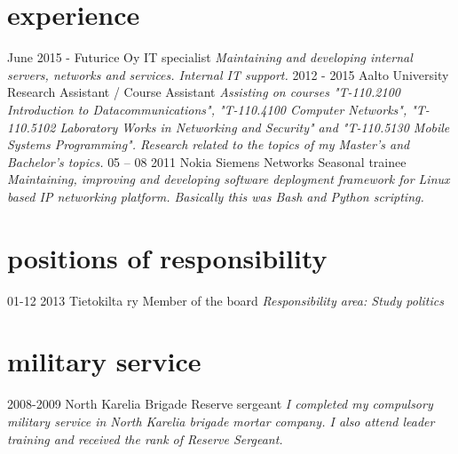 \documentclass[]{friggeri-cv}
\begin{document}
\section{experience}

\begin{entrylist}
  \entry
    {June 2015 -}
    {Futurice Oy}
    {IT specialist}
    {\emph{Maintaining and developing internal servers, networks and services. Internal IT support.}}
  \entry
    {2012 - 2015}
    {Aalto University}
    {Research Assistant / Course Assistant}
    {\emph{Assisting on courses "T-110.2100 Introduction to Datacommunications", "T-110.4100 Computer Networks", "T-110.5102 Laboratory Works in Networking and Security" and "T-110.5130 Mobile Systems Programming". Research related to the topics of my Master's and Bachelor's topics.}}
  \entry
    {05 – 08 2011}
    {Nokia Siemens Networks}
    {Seasonal trainee}
    {\emph{Maintaining, improving and developing software deployment framework for Linux based IP networking platform. Basically this was Bash and Python scripting.}}
\end{entrylist}

\section{positions of responsibility}
  \begin{entrylist}
    \entry
      {01-12 2013}
      {Tietokilta ry}
      {Member of the board}
      {\emph{Responsibility area: Study politics}}
  \end{entrylist}

\section{military service}
  \begin{entrylist}
    \entry
      {2008-2009}
      {North Karelia Brigade}
      {Reserve sergeant}
      {\emph{I completed my compulsory military service in North Karelia brigade mortar company. I also attend leader training and received the rank of Reserve Sergeant.}}
  \end{entrylist}
\end{document}
